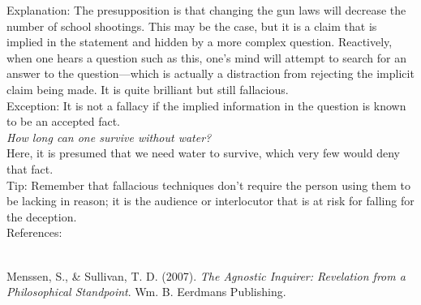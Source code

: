 \documentclass[a4paper,12pt,single,pdftex]{scrbook}
\begin{document}
    
      Explanation: The presupposition is that changing the gun laws will decrease the number of school shootings.  This may be the case, but it is a claim that is implied in the statement and hidden by a more complex question.  Reactively, when one hears a question such as this, one's mind will attempt to search for an answer to the question—which is actually a distraction from rejecting the implicit claim being made.  It is quite brilliant but still fallacious.
    \\

    
      Exception: It is not a fallacy if the implied information in the question is known to be an accepted fact.
    \\

    
      {\em How long can one survive without water?}
    \\

    
      Here, it is presumed that we need water to survive, which very few would deny that fact.
    \\

    
      Tip: Remember that fallacious techniques don’t require the person using them to be lacking in reason; it is the audience or interlocutor that is at risk for falling for the deception.
    \\

    References:

    
      
        
      \\

      
        
          Menssen, S., \& Sullivan, T. D. (2007). {\it The Agnostic Inquirer: Revelation from a Philosophical Standpoint}. Wm. B. Eerdmans Publishing.
        
      
    
\end{document}
